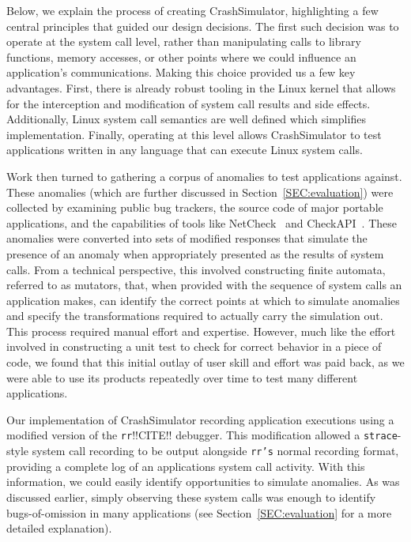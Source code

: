 Below, we explain the process of creating CrashSimulator, highlighting a
few central principles that guided our design decisions. The first such
decision was to operate at the system call level, rather than manipulating
calls to library functions, memory accesses, or other points where we could
influence an application's communications. Making this choice provided us a
few key advantages. First, there is already robust tooling in the Linux
kernel that allows for the interception and modification of system call
results and side effects. Additionally, Linux system call semantics are
well defined which simplifies implementation. Finally, operating at this
level allows CrashSimulator to test applications written in any language
that can execute Linux system calls.

Work then turned to gathering a corpus of anomalies to test applications
against.  These anomalies (which are further discussed
in Section~\ref{SEC:evaluation})
were collected by examining public bug trackers,
the source code of major portable applications, and the capabilities of
tools like NetCheck~\cite{Zhuang_NSDI_2014}
and CheckAPI~\cite{rasley2015detecting}.  These anomalies were converted
into sets of modified responses
that simulate the presence of an anomaly when
appropriately presented as the results of system calls.
From a technical perspective, this involved constructing finite automata,
referred to as mutators, that, when provided with the sequence of system
calls an application makes, can identify the correct points at which to
simulate anomalies and specify the transformations required to actually
carry the simulation out.
This process required manual effort and expertise.
However,
much like
the effort involved in constructing a unit test to check for correct
behavior in a piece of code, we found that this initial outlay of
user skill and effort was paid back, as
we were able to use its products
repeatedly over time to test many different applications.

Our implementation of CrashSimulator 
recording application executions
using a modified version of the {\tt rr}!!CITE!!
debugger.  This modification allowed
a {\tt strace}-style
system call recording to be output alongside {\tt rr's} normal recording
format, providing
a complete log of an applications system call activity.
With this information, we could
easily identify opportunities to simulate anomalies.  As was
discussed earlier, simply observing these system calls was enough to
identify bugs-of-omission in many applications
(see Section~\ref{SEC:evaluation} for a more detailed explanation).

